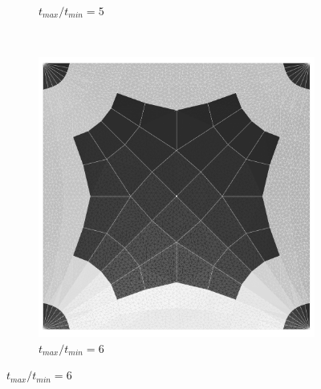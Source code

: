 \begin{figure}[H]
\begin{subfigure}[b]{.32\textwidth}
  \caption{$t_{max}/t_{min}=5$}
\end{subfigure}
~
\begin{subfigure}[b]{.32\textwidth}
  \centering
  \includegraphics[width=.99\linewidth]{images/t_opt_l2d15_gamma6}
  \caption{$t_{max}/t_{min}=6$}
\end{subfigure}


\end{figure}
